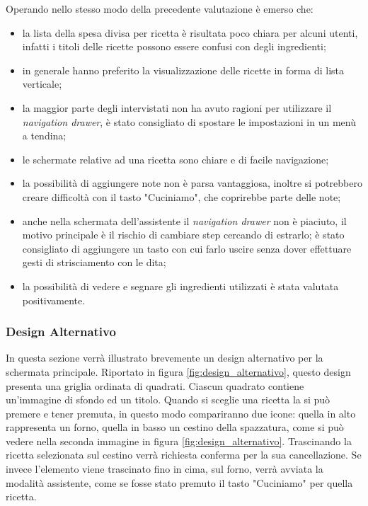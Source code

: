 Operando nello stesso modo della precedente valutazione è emerso che:
\begin{itemize}
  \item la lista della spesa divisa per ricetta è risultata poco chiara per alcuni utenti, infatti i titoli delle ricette possono essere confusi con degli ingredienti;
  \item in generale hanno preferito la visualizzazione delle ricette in forma di lista verticale;
  \item la maggior parte degli intervistati non ha avuto ragioni per utilizzare il \textit{navigation drawer}, è stato consigliato di spostare le impostazioni in un menù a tendina;
  \item le schermate relative ad una ricetta sono chiare e di facile navigazione;
  \item la possibilità di aggiungere note non è parsa vantaggiosa, inoltre si potrebbero creare difficoltà con il tasto "Cuciniamo", che coprirebbe parte delle note;
  \item anche nella schermata dell'assistente il \textit{navigation drawer} non è piaciuto, il motivo principale è il rischio di cambiare step cercando di estrarlo; è stato consigliato di aggiungere un tasto con cui farlo uscire senza dover effettuare gesti di strisciamento con le dita;
  \item la possibilità di vedere e segnare gli ingredienti utilizzati è stata valutata positivamente.
\end{itemize}



\clearpage
\subsubsection{Design Alternativo}
In questa sezione verrà illustrato brevemente un design alternativo per la schermata principale.
Riportato in figura \ref{fig:design_alternativo}, questo design presenta una griglia ordinata di quadrati.
Ciascun quadrato contiene un'immagine di sfondo ed un titolo.
Quando si sceglie una ricetta la si può premere e tener premuta, in questo modo compariranno due icone: quella in alto rappresenta un forno, quella in basso un cestino della spazzatura, come si può vedere nella seconda immagine in figura \ref{fig:design_alternativo}.
Trascinando la ricetta selezionata sul cestino verrà richiesta conferma per la sua cancellazione.
Se invece l'elemento viene trascinato fino in cima, sul forno, verrà avviata la modalità assistente, come se fosse stato premuto il tasto "Cuciniamo" per quella ricetta.


